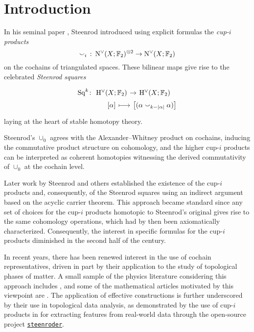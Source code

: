 
\section{Introduction}\label{s:introduction}

In his seminal paper \cite{steenrod1947products}, Steenrod introduced using explicit formulas the \textit{cup-$i$ products}
\[
\smallsmile_i\ \colon \operatorname{N^{\vee}}(X; {\mathbb{F}_2})^{\otimes 2} \to \operatorname{N^{\vee}}(X; {\mathbb{F}_2})
\]
on the cochains of triangulated spaces.
These bilinear maps give rise to the celebrated \textit{Steenrod squares}
\[
\begin{tikzcd}[column sep=0, row sep=0]
	\Sq^k \colon &[-5pt] \rH^\vee(X; \F) \rar & \rH^\vee(X; \F) \\
	& {[\alpha]} \rar[maps to] & \big[(\alpha \cup_{k-\bars{\alpha}} \alpha)\big]
\end{tikzcd}
\]
laying at the heart of stable homotopy theory.

Steenrod's $\cup_0$ agrees with the Alexander--Whitney product on cochains, inducing the commutative product structure on cohomology, and the higher cup-$i$ products can be interpreted as coherent homotopies witnessing the derived commutativity of $\cup_0$ at the cochain level.

Later work by Steenrod and others established the existence of the cup-$i$ products and, consequently, of the Steenrod squares using an indirect argument based on the acyclic carrier theorem.
This approach became standard since any set of choices for the cup-$i$ products homotopic to Steenrod's original gives rise to the same cohomology operations, which had by then been axiomatically characterized.
Consequently, the interest in specific formulas for the cup-$i$ products diminished in the second half of the century.

In recent years, there has been renewed interest in the use of cochain representatives, driven in part by their application to the study of topological phases of matter.
A small sample of the physics literature considering this approach includes \cite{gaiotto2016spin, kapustin2017fermionic, meng2018classification, wang2020construction, barkeshli2021classification, tata2021anomalies, tata2021cubical}, and some of the mathematical articles motivated by this viewpoint are \cite{brumfiel2016pontrjagin, brumfiel2018pontrjagin, medina2020cartan, medina2021adem}.
The application of effective constructions is further underscored by their use in topological data analysis, as demonstrated by the use of cup-$i$ products in \cite{medina2022per_st} for extracting features from real-world data through the open-source project \href{https://github.com/Steenroder/steenroder}{\texttt{steenroder}}.

